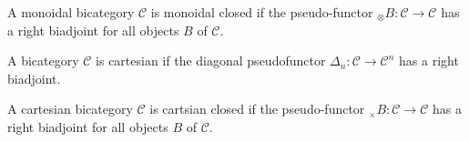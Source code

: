 \documentclass[10pt]{llncs}
\begin{document}
\begin{definition}
A monoidal bicategory $\mathcal{C}$ is monoidal closed if the pseudo-functor $_ \otimes B: \mathcal{C} \rightarrow \mathcal{C}$ has a right biadjoint for all objects $B$ of $\mathcal{C}$.
\end{definition}

\begin{definition}
A bicategory $\mathcal{C}$ is cartesian if the diagonal pseudofunctor $\Delta_n:\mathcal{C} \rightarrow \mathcal{C}^n$ has a right biadjoint. 
\end{definition}
\begin{definition}
A cartesian bicategory $\mathcal{C}$ is cartsian closed if the pseudo-functor $_ \times B: \mathcal{C} \rightarrow \mathcal{C}$ has a right biadjoint for all objects $B$ of $\mathcal{C}$.
\end{definition}
\end{document}
